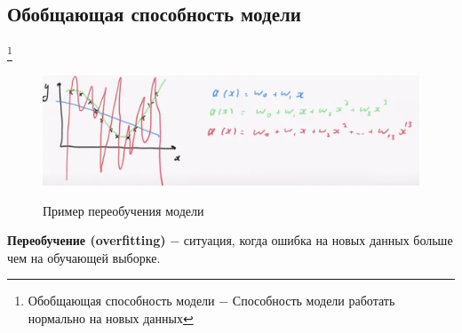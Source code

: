         \subsection{Обобщающая способность модели}\footnote{Обобщающая способность модели $-$ Способность модели работать нормально на новых данных}

            \begin{figure}[H]
                \centering
                
                \caption{Пример переобучения модели}
                \includegraphics[width=1\textwidth]{images/2lecture/OverFitting.png}
                \label{fig:overfitting}

            \end{figure}

            \begin{definition}
                \textbf{Переобучение (overfitting)} $-$ ситуация, когда ошибка на новых данных больше чем на обучающей выборке.\\
            \end{definition}

